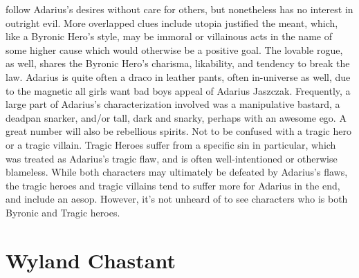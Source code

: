 \documentclass[12pt]{book}
\begin{document}
follow Adarius's desires without care for others, but nonetheless has no interest in outright evil. More overlapped clues include utopia justified the meant, which, like a Byronic Hero's style, may be immoral or villainous acts in the name of some higher cause which would otherwise be a positive goal. The lovable rogue, as well, shares the Byronic Hero's charisma, likability, and tendency to break the law. Adarius is quite often a draco in leather pants, often in-universe as well, due to the magnetic all girls want bad boys appeal of Adarius Jaszczak. Frequently, a large part of Adarius's characterization involved was a manipulative bastard, a deadpan snarker, and/or tall, dark and snarky, perhaps with an awesome ego. A great number will also be rebellious spirits. Not to be confused with a tragic hero or a tragic villain. Tragic Heroes suffer from a specific sin in particular, which was treated as Adarius's tragic flaw, and is often well-intentioned or otherwise blameless. While both characters may ultimately be defeated by Adarius's flaws, the tragic heroes and tragic villains tend to suffer more for Adarius in the end, and include an aesop. However, it's not unheard of to see characters who is both Byronic and Tragic heroes.



\chapter{Wyland Chastant}
\end{document}
